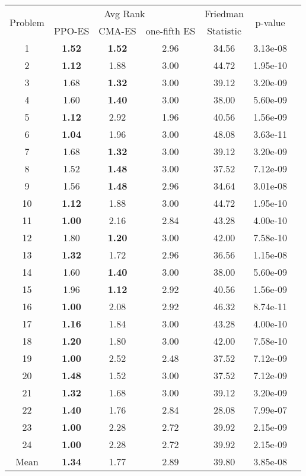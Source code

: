 
        \begin{tabular}{ccccccc}
        \toprule
        \multirow{2}{*}{Problem} & \multicolumn{3}{c}{Avg Rank} & Friedman & \multirow{2}{*}{p-value} \\
        \cline{2-4}
        & PPO-ES & CMA-ES & one-fifth ES & Statistic & \\
        \midrule
        1 & \textbf{1.52} & \textbf{1.52} & 2.96 & 34.56 & 3.13e-08 \\
2 & \textbf{1.12} & 1.88 & 3.00 & 44.72 & 1.95e-10 \\
3 & 1.68 & \textbf{1.32} & 3.00 & 39.12 & 3.20e-09 \\
4 & 1.60 & \textbf{1.40} & 3.00 & 38.00 & 5.60e-09 \\
5 & \textbf{1.12} & 2.92 & 1.96 & 40.56 & 1.56e-09 \\
6 & \textbf{1.04} & 1.96 & 3.00 & 48.08 & 3.63e-11 \\
7 & 1.68 & \textbf{1.32} & 3.00 & 39.12 & 3.20e-09 \\
8 & 1.52 & \textbf{1.48} & 3.00 & 37.52 & 7.12e-09 \\
9 & 1.56 & \textbf{1.48} & 2.96 & 34.64 & 3.01e-08 \\
10 & \textbf{1.12} & 1.88 & 3.00 & 44.72 & 1.95e-10 \\
11 & \textbf{1.00} & 2.16 & 2.84 & 43.28 & 4.00e-10 \\
12 & 1.80 & \textbf{1.20} & 3.00 & 42.00 & 7.58e-10 \\
13 & \textbf{1.32} & 1.72 & 2.96 & 36.56 & 1.15e-08 \\
14 & 1.60 & \textbf{1.40} & 3.00 & 38.00 & 5.60e-09 \\
15 & 1.96 & \textbf{1.12} & 2.92 & 40.56 & 1.56e-09 \\
16 & \textbf{1.00} & 2.08 & 2.92 & 46.32 & 8.74e-11 \\
17 & \textbf{1.16} & 1.84 & 3.00 & 43.28 & 4.00e-10 \\
18 & \textbf{1.20} & 1.80 & 3.00 & 42.00 & 7.58e-10 \\
19 & \textbf{1.00} & 2.52 & 2.48 & 37.52 & 7.12e-09 \\
20 & \textbf{1.48} & 1.52 & 3.00 & 37.52 & 7.12e-09 \\
21 & \textbf{1.32} & 1.68 & 3.00 & 39.12 & 3.20e-09 \\
22 & \textbf{1.40} & 1.76 & 2.84 & 28.08 & 7.99e-07 \\
23 & \textbf{1.00} & 2.28 & 2.72 & 39.92 & 2.15e-09 \\
24 & \textbf{1.00} & 2.28 & 2.72 & 39.92 & 2.15e-09 \\
\midrule
Mean & \textbf{1.34} & 1.77 & 2.89 & 39.80 & 3.85e-08 \\
\bottomrule
\end{tabular}